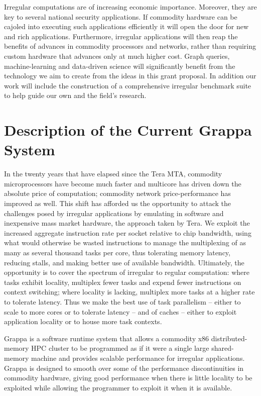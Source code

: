 Irregular computations are of increasing economic importance.  Moreover, they are key to several national security applications.  If commodity hardware can be cajoled into executing such applications efficiently it will open the door for new and rich applications.  Furthermore, irregular applications will then reap the benefits of advances in commodity processors and networks, rather than requiring custom hardware that advances only at much higher cost.  Graph queries, machine-learning and data-driven science will significantly benefit from the technology we aim to create from the ideas in this grant proposal.  In addition our work will include the construction of a comprehensive irregular benchmark suite to help guide our own and the field's research.


\section{Description of the Current Grappa System}

In the twenty years that have elapsed since the Tera MTA, commodity
microprocessors have become much faster and multicore has driven down the
absolute price of computation; commodity network price-performance has
improved as well. This shift has afforded us the opportunity to attack the
challenges posed by irregular applications by emulating in software and
inexpensive mass market hardware, the approach taken by Tera. We exploit the
increased aggregate instruction rate per socket relative to chip bandwidth,
using what would otherwise be wasted instructions to manage the multiplexing
of as many as several thousand tasks per core, thus tolerating memory latency,
reducing stalls, and making better use of available bandwidth. Ultimately, the
opportunity is to cover the spectrum of irregular to regular computation:
where tasks exhibit locality, multiplex fewer tasks and expend fewer
instructions on context switching; where locality is lacking, multiplex more
tasks at a higher rate to tolerate latency. Thus we make the best use of task
parallelism -- either to scale to more cores or to tolerate latency -- and of
caches -- either to exploit application locality or to house more task
contexts.

Grappa is a software runtime system that allows a commodity x86
distributed-memory HPC cluster to be programmed as if it were a single large
shared-memory machine and provides scalable performance for irregular
applications. Grappa is designed to smooth over some of the performance
discontinuities in commodity hardware, giving good performance when there is
little locality to be exploited while allowing the programmer to exploit it
when it is available.

